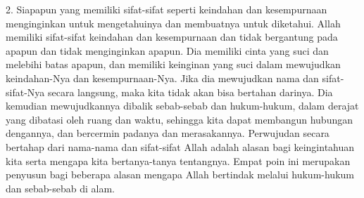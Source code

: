 \documentclass[]{article}
\begin{document}
2. Siapapun yang memiliki sifat-sifat seperti keindahan dan kesempurnaan  menginginkan untuk mengetahuinya  dan membuatnya untuk diketahui. Allah memiliki sifat-sifat  keindahan dan kesempurnaan  dan tidak bergantung pada apapun dan tidak menginginkan apapun. Dia memiliki cinta yang suci dan melebihi batas apapun, dan memiliki keinginan yang suci dalam mewujudkan keindahan-Nya dan kesempurnaan-Nya. Jika dia mewujudkan nama dan sifat-sifat-Nya secara langsung, maka kita tidak akan bisa bertahan darinya. Dia kemudian mewujudkannya dibalik sebab-sebab dan hukum-hukum, dalam derajat yang dibatasi oleh ruang dan waktu, sehingga kita dapat membangun hubungan dengannya, dan bercermin padanya dan merasakannya. Perwujudan secara bertahap dari nama-nama dan sifat-sifat Allah adalah alasan bagi keingintahuan kita serta mengapa kita bertanya-tanya tentangnya.
Empat poin ini merupakan penyusun bagi beberapa alasan mengapa Allah bertindak melalui hukum-hukum dan sebab-sebab di alam. 
\end{document}
